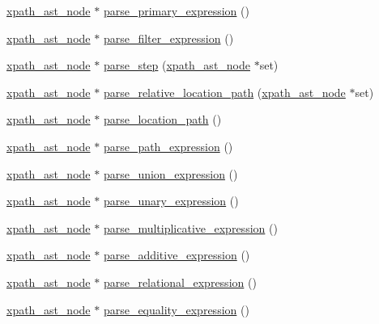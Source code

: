 \begin{DoxyCompactItemize}
\item 
\hyperlink{classxpath__ast__node}{xpath\_\-ast\_\-node} $\ast$ \hyperlink{structxpath__parser_a320728b83e426c4874066d633ffe65d9}{parse\_\-primary\_\-expression} ()
\item 
\hyperlink{classxpath__ast__node}{xpath\_\-ast\_\-node} $\ast$ \hyperlink{structxpath__parser_a0530aefc1445c4eac4614e895dd0a219}{parse\_\-filter\_\-expression} ()
\item 
\hyperlink{classxpath__ast__node}{xpath\_\-ast\_\-node} $\ast$ \hyperlink{structxpath__parser_a7daf146822e199d8ad564be25daa49db}{parse\_\-step} (\hyperlink{classxpath__ast__node}{xpath\_\-ast\_\-node} $\ast$set)
\item 
\hyperlink{classxpath__ast__node}{xpath\_\-ast\_\-node} $\ast$ \hyperlink{structxpath__parser_ab50d8b75f78b7e2eb77a1cf6872daa00}{parse\_\-relative\_\-location\_\-path} (\hyperlink{classxpath__ast__node}{xpath\_\-ast\_\-node} $\ast$set)
\item 
\hyperlink{classxpath__ast__node}{xpath\_\-ast\_\-node} $\ast$ \hyperlink{structxpath__parser_aae61a2931ba0b0c713b5d043f1cef6d4}{parse\_\-location\_\-path} ()
\item 
\hyperlink{classxpath__ast__node}{xpath\_\-ast\_\-node} $\ast$ \hyperlink{structxpath__parser_a024b539aa4ea7226edce0a3d0a577549}{parse\_\-path\_\-expression} ()
\item 
\hyperlink{classxpath__ast__node}{xpath\_\-ast\_\-node} $\ast$ \hyperlink{structxpath__parser_a2b5326e67d26a880cf29343a61e23891}{parse\_\-union\_\-expression} ()
\item 
\hyperlink{classxpath__ast__node}{xpath\_\-ast\_\-node} $\ast$ \hyperlink{structxpath__parser_af5f2714594608f2536f3324c27ce7969}{parse\_\-unary\_\-expression} ()
\item 
\hyperlink{classxpath__ast__node}{xpath\_\-ast\_\-node} $\ast$ \hyperlink{structxpath__parser_a384f3f30c6182714b02df188314abb95}{parse\_\-multiplicative\_\-expression} ()
\item 
\hyperlink{classxpath__ast__node}{xpath\_\-ast\_\-node} $\ast$ \hyperlink{structxpath__parser_a7744f7e05f69fa9c073d7a241036ee08}{parse\_\-additive\_\-expression} ()
\item 
\hyperlink{classxpath__ast__node}{xpath\_\-ast\_\-node} $\ast$ \hyperlink{structxpath__parser_a2a3164bf53415c43fbe0b5293d8c9efe}{parse\_\-relational\_\-expression} ()
\item 
\hyperlink{classxpath__ast__node}{xpath\_\-ast\_\-node} $\ast$ \hyperlink{structxpath__parser_aa63ac82f43eaa1c9f8769174adc87f48}{parse\_\-equality\_\-expression} ()

\end{DoxyCompactItemize}
